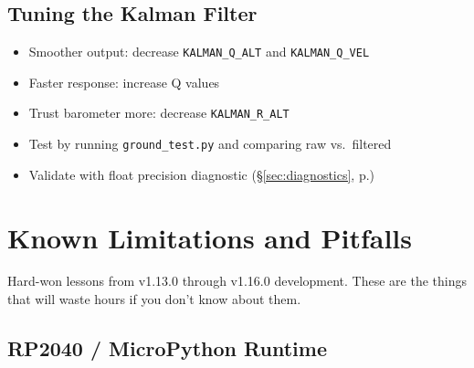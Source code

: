 \documentclass[11pt, a4paper, twoside]{article}
\newcommand{\config}[1]{\texttt{#1}}
\newcommand{\file}[1]{\texttt{#1}}
\newcommand{\xref}[1]{(\S\ref{#1}, p.\pageref{#1})}
\begin{document}
\subsection{Tuning the Kalman Filter}
\begin{itemize}
    \item Smoother output: decrease \config{KALMAN\_Q\_ALT} and \config{KALMAN\_Q\_VEL}
    \item Faster response: increase Q values
    \item Trust barometer more: decrease \config{KALMAN\_R\_ALT}
    \item Test by running \file{ground\_test.py} and comparing raw vs.\ filtered
    \item Validate with float precision diagnostic \xref{sec:diagnostics}
\end{itemize}

\section{Known Limitations and Pitfalls}
\label{sec:known-issues}

Hard-won lessons from v1.13.0 through v1.16.0 development. These are the things that will waste hours if you don't know about them.

\subsection{RP2040 / MicroPython Runtime}
\end{document}
